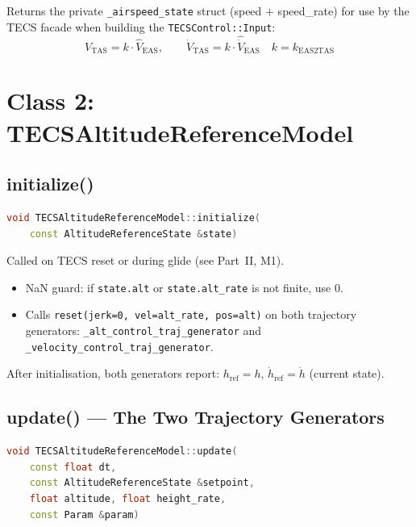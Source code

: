 \documentclass[12pt,a4paper]{article}
\begin{document}
Returns the private \texttt{\_airspeed\_state} struct
(speed $+$ speed\_rate) for use by the TECS facade when building the
\texttt{TECSControl::Input}:
\begin{equation}
  V_{\text{TAS}} = k \cdot \hat{V}_{\text{EAS}}, \qquad
  \dot{V}_{\text{TAS}} = k \cdot \hat{\dot{V}}_{\text{EAS}}
  \quad k = k_{\text{EAS2TAS}}
\end{equation}

\section{Class 2: TECSAltitudeReferenceModel}

\subsection{initialize()}

\begin{lstlisting}[language=C++]
void TECSAltitudeReferenceModel::initialize(
    const AltitudeReferenceState &state)
\end{lstlisting}

Called on TECS reset or during glide (see Part~II, M1).

\begin{itemize}
  \item NaN guard: if \texttt{state.alt} or \texttt{state.alt\_rate} is
        not finite, use 0.
  \item Calls \texttt{reset(jerk=0, vel=alt\_rate, pos=alt)} on both
        trajectory generators: \texttt{\_alt\_control\_traj\_generator}
        and \texttt{\_velocity\_control\_traj\_generator}.
\end{itemize}

After initialisation, both generators report:
$h_{\text{ref}} = h$, $\dot{h}_{\text{ref}} = \dot{h}$ (current state).

\subsection{update() --- The Two Trajectory Generators}

\begin{lstlisting}[language=C++]
void TECSAltitudeReferenceModel::update(
    const float dt,
    const AltitudeReferenceState &setpoint,
    float altitude, float height_rate,
    const Param &param)
\end{lstlisting}
\end{document}
